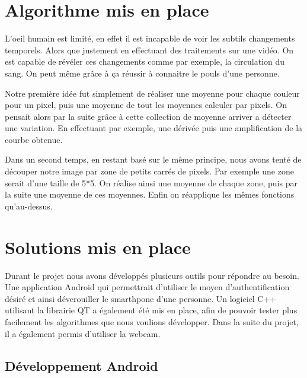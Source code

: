 \section{Algorithme mis en place}

L'oeil humain est limité, en effet il est incapable de voir les subtils changements temporels. Alors
que justement en effectuant des traitements sur une vidéo. On est capable de révéler ces changements
comme par exemple, la circulation du sang. On peut même grâce à ça réussir à connaitre le pouls d'une
personne. 

Notre première idée fut simplement de réaliser une moyenne pour chaque couleur pour un pixel, puis 
une moyenne de tout les moyennes calculer par pixels. On pensait alors par la suite grâce à cette 
collection de moyenne arriver a détecter une variation. En effectuant par exemple, une dérivée puis
une amplification de la courbe obtenue.  

Dans un second temps, en restant basé sur le même principe, nous avons tenté de découper notre image
par zone de petits carrés de pixels. Par exemple une zone serait d'une taille de 5*5. On réalise 
ainsi une moyenne de chaque zone, puis par la suite une moyenne de ces moyennes. Enfin on réapplique
les mêmes fonctions qu'au-dessus.

\section{Solutions mis en place}

Durant le projet nous avons développés plusieurs outils pour répondre au besoin. Une application Android qui permettrait d'utiliser le moyen d'authentification désiré et ainsi déverouiller le smarthpone d'une
personne. Un logiciel C++ utilisant la librairie QT a également été mis en place, afin de pouvoir tester plus facilement les algorithmes que nous voulions développer. Dans la suite du projet, il a également
permis d'utiliser la webcam. 

\subsection{Développement Android}

